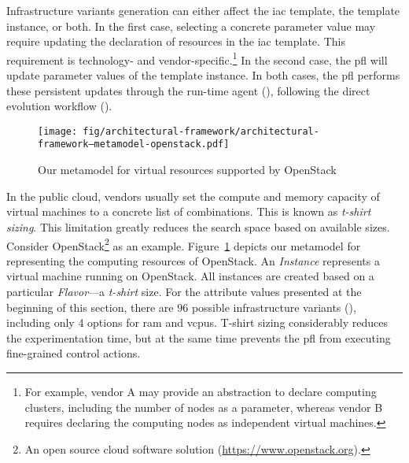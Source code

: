Infrastructure variants generation can either affect the \gls{iac} template, the template instance, or both. In the first case, selecting a concrete parameter value may require updating the declaration of resources in the \gls{iac} template. This requirement is technology- and vendor-specific.\footnote{For example, vendor A may provide an abstraction to declare computing clusters, including the number of nodes as a parameter, whereas vendor B requires declaring the computing nodes as independent virtual machines.} In the second case, the \gls{pfl} will update parameter values of the template instance. In both cases, the \gls{pfl} performs these persistent updates through the run-time agent (), following the direct evolution workflow ().

\begin{figure}[h]
	\centering
	\texttt{[image: fig/architectural-framework/architectural-framework--metamodel-openstack.pdf]}
	\caption{Our metamodel for virtual resources supported by OpenStack}
	\label{fig:architectural-framework--model-openstack}
\end{figure}


In the public cloud, vendors usually set the compute and memory capacity of virtual machines to a concrete list of combinations. This is known as \emph{t-shirt sizing}. This limitation greatly reduces the search space based on available sizes. Consider OpenStack\footnote{An open source cloud software solution (\url{https://www.openstack.org}).} as an example. Figure~\ref{fig:architectural-framework--model-openstack} depicts our metamodel for representing the computing resources of OpenStack. An \emph{Instance} represents a virtual machine running on OpenStack. All instances are created based on a particular \emph{Flavor}---a \emph{t-shirt} size. For the attribute values presented at the beginning of this section, there are 96 possible infrastructure variants (), including only 4 options for  \gls{ram} and  \glspl{vcpu}. T-shirt sizing considerably reduces the experimentation time, but at the same time prevents the \gls{pfl} from executing fine-grained control actions.

